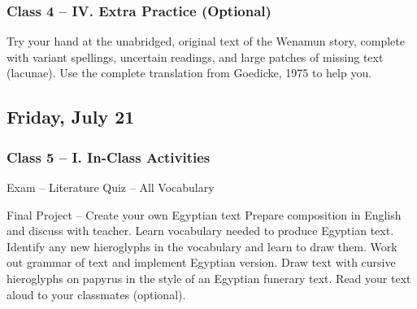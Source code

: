 \documentclass[11pt]{article}
\begin{document}
		\subsubsection*{Class 4 -- IV. Extra Practice (Optional)}
			Try your hand at the unabridged, original text of the Wenamun story,
				complete with variant spellings, uncertain readings, and large patches of missing text (lacunae).
			Use the complete translation from Goedicke, 1975 to help you.
			
	\subsection*{Friday, July 21}
		\subsubsection*{Class 5 -- I. In-Class Activities}
			\begin{outline}[itemize]
				\1 Exam -- Literature
				\1 Quiz -- All Vocabulary
				
				\1 Final Project -- Create your own Egyptian text
					\2 Prepare composition in English and discuss with teacher.
					\2 Learn vocabulary needed to produce Egyptian text.
					\2 Identify any new hieroglyphs in the vocabulary and learn to draw them.
					\2 Work out grammar of text and implement Egyptian version.
					\2 Draw text with cursive hieroglyphs on papyrus in the style of an Egyptian funerary text.
					\2 Read your text aloud to your classmates (optional).
				
					
			\end{outline}
	
%	
\end{document}
